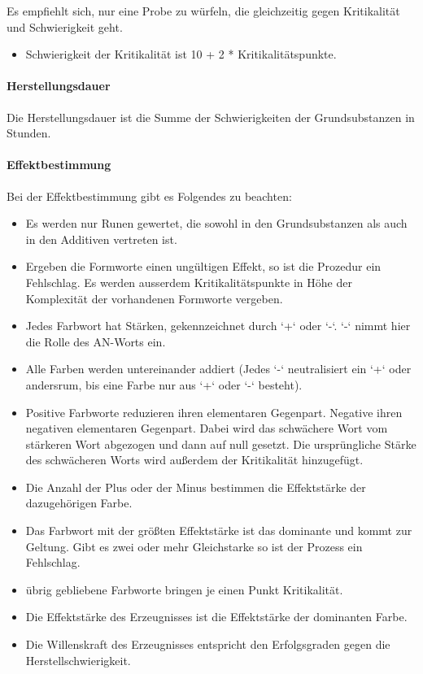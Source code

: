 \documentclass{article}
\begin{document}
Es empfiehlt sich, nur eine Probe zu würfeln, die gleichzeitig gegen Kritikalität und Schwierigkeit
geht.

\begin{itemize}
\item Schwierigkeit der Kritikalität ist 10 + 2 * Kritikalitätspunkte.
\end{itemize}

\paragraph{Herstellungsdauer}

Die Herstellungsdauer ist die Summe der Schwierigkeiten der Grundsubstanzen in Stunden.

\paragraph{Effektbestimmung}

Bei der Effektbestimmung gibt es Folgendes zu beachten:

\begin{itemize}
\item Es werden nur Runen gewertet, die sowohl in den Grundsubstanzen als auch in den Additiven vertreten ist.
\item Ergeben die Formworte einen ungültigen Effekt, so ist die Prozedur ein Fehlschlag. Es werden ausserdem Kritikalitätspunkte in Höhe der Komplexität der vorhandenen Formworte vergeben.
\item Jedes Farbwort hat Stärken, gekennzeichnet durch `+` oder `-`. `-` nimmt hier die Rolle des AN-Worts ein.
\item Alle Farben werden untereinander addiert (Jedes `-` neutralisiert ein `+` oder andersrum, bis eine Farbe nur aus `+` oder  `-` besteht).
\item Positive Farbworte reduzieren ihren elementaren Gegenpart. Negative ihren negativen elementaren Gegenpart. Dabei wird das schwächere Wort vom stärkeren Wort abgezogen und dann auf null gesetzt. Die ursprüngliche Stärke des schwächeren Worts wird außerdem der Kritikalität hinzugefügt.
\item Die Anzahl der Plus oder der Minus bestimmen die Effektstärke der dazugehörigen Farbe.
\item Das Farbwort mit der größten Effektstärke ist das dominante und kommt zur Geltung. Gibt es zwei oder mehr Gleichstarke so ist der Prozess ein Fehlschlag.
\item übrig gebliebene Farbworte bringen je einen Punkt Kritikalität.
\item Die Effektstärke des Erzeugnisses ist die Effektstärke der dominanten Farbe.
\item Die Willenskraft des Erzeugnisses entspricht den Erfolgsgraden gegen die Herstellschwierigkeit.
\end{itemize}
\end{document}
